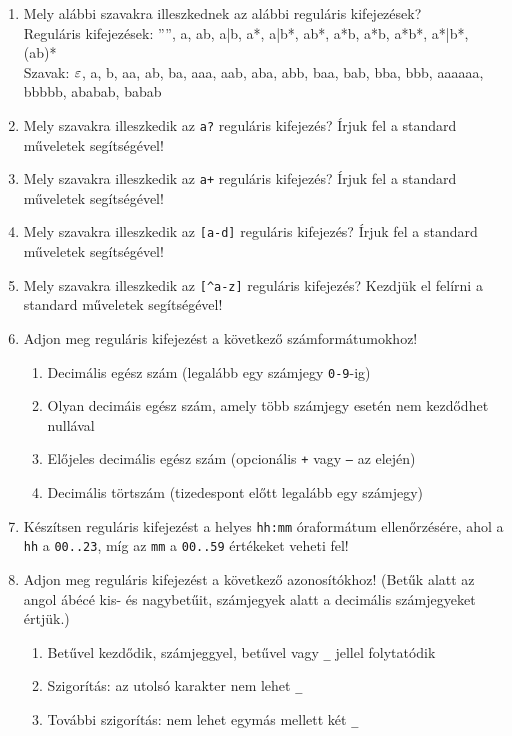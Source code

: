 \begin{enumerate}
	\item Mely alábbi szavakra illeszkednek az alábbi reguláris kifejezések? \\
	Reguláris kifejezések: ””, a, ab, a|b, a*, a|b*, ab*, a*b, a*b, a*b*, a*|b*, (ab)* \\
	Szavak: $\varepsilon$, a, b, aa, ab, ba, aaa, aab, aba, abb, baa, bab, bba, bbb, aaaaaa, bbbbb, ababab, babab
	\item  Mely szavakra illeszkedik az \texttt{a?} reguláris kifejezés? Írjuk fel a standard műveletek segítségével!
	\item Mely szavakra illeszkedik az \texttt{a+} reguláris kifejezés? Írjuk fel a standard műveletek segítségével!
	\item Mely szavakra illeszkedik az \texttt{[a-d]} reguláris kifejezés? Írjuk fel a standard műveletek segítségével!
	\item Mely szavakra illeszkedik az \verb|[^a-z]| reguláris kifejezés? Kezdjük el felírni a standard műveletek
	segítségével!
	\item Adjon meg reguláris kifejezést a következő számformátumokhoz!
	\begin{enumerate}
		\item Decimális egész szám (legalább egy számjegy \texttt{0-9}-ig)
		\item Olyan decimáis egész szám, amely több számjegy esetén nem kezdődhet nullával
		\item Előjeles decimális egész szám (opcionális \texttt{+} vagy \texttt{–} az elején)
		\item Decimális törtszám (tizedespont előtt legalább egy számjegy)
	\end{enumerate}
	\item Készítsen reguláris kifejezést a helyes \texttt{hh:mm} óraformátum ellenőrzésére, ahol a \texttt{hh} a \texttt{00..23}, míg az \texttt{mm} a \texttt{00..59} értékeket veheti fel!
	\item Adjon meg reguláris kifejezést a következő azonosítókhoz! (Betűk alatt az angol ábécé kis- és nagybetűit, számjegyek alatt a decimális számjegyeket értjük.)
	\begin{enumerate}
		\item Betűvel kezdődik, számjeggyel, betűvel vagy \texttt{\_} jellel folytatódik
		\item Szigorítás: az utolsó karakter nem lehet \texttt{\_}
		\item További szigorítás: nem lehet egymás mellett két \texttt{\_}

\end{enumerate}
\end{enumerate}
